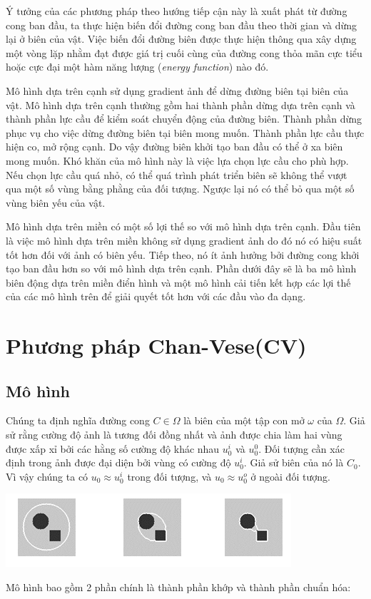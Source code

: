 \documentclass[12pt, oneside, a4paper]{book}
\begin{document}
Ý tưởng của các phương pháp theo hướng tiếp cận này là xuất phát từ đường cong ban đầu, ta thực hiện biến đổi đường cong ban đầu theo thời gian  và dừng lại ở biên của vật. Việc biến đổi đường biên được thực hiện thông qua xây dựng một vòng lặp nhằm đạt được giá trị cuối cùng của đường cong thỏa mãn cực tiểu hoặc cực đại một hàm năng lượng (\textit{energy function}) nào đó.

Mô hình dựa trên cạnh sử dụng gradient ảnh để dừng đường biên tại biên của vật. Mô hình dựa trên cạnh thường gồm hai thành phần dừng dựa trên cạnh  và thành phần lực cầu để kiểm soát chuyển động của đường biên. Thành phần dừng phục vụ cho việc dừng đường biên tại biên mong muốn. Thành phần lực cầu thực hiện co, mở rộng cạnh. Do vậy đường biên khởi tạo ban đầu có thể ở xa biên mong muốn. Khó khăn của mô hình này là việc lựa chọn lực cầu cho phù hợp. Nếu chọn lực cầu quá nhỏ, có thể quá trình phát triển biên sẽ không thể vượt qua một số vùng bằng phằng của đối tượng. Ngược lại nó có thể bỏ qua một số vùng biên yếu của vật.

Mô hình dựa trên miền có một số lợi thế so với mô hình dựa trên cạnh. Đầu tiên là việc mô hình dựa trên miền không sử dụng gradient ảnh do đó nó có hiệu suất tốt hơn đối với ảnh có biên yếu. Tiếp theo, nó ít ảnh hưởng bởi đường cong khởi tạo ban đầu hơn so với mô hình dựa trên cạnh.  Phần dưới đây sẽ là ba mô hình biên động dựa trên miền điển hình và một mô hình cải tiến kết hợp các lợi thế của các mô hình trên để giải quyết tốt hơn với các đầu vào đa dạng.
\section{Phương pháp Chan-Vese(CV)}
\subsection{Mô hình}
Chúng ta định nghĩa đường cong $C\in \Omega$ là biên của một tập con mở $\omega$ của $\Omega$. Giả sử rằng cường độ ảnh là tương đối đồng nhất và ảnh được chia làm hai vùng được xấp xỉ bởi các hằng số cường độ khác nhau $u_0^i$ và $u_0^0$. Đối tượng cần xác định trong ảnh được đại diện bởi vùng có cường độ $u_0^i$. Giả sử biên của nó là $C_0$. Vì vậy chúng ta có $u_0\approx u_0^i$ trong đối tượng, và $u_0\approx u_0^o$ ở ngoài đối tượng.
\begin{center}
\includegraphics[scale=1]{figure/ytuong.png}
\end{center}
Mô hình bao gồm 2 phần chính là thành phần khớp và thành phần chuẩn hóa: 
\end{document}
